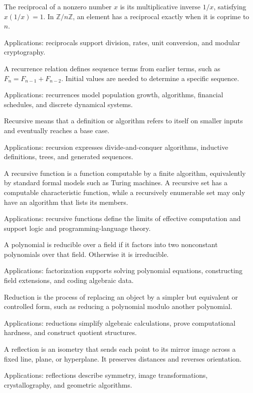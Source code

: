 The reciprocal of a nonzero number $x$ is its multiplicative inverse $1/x$, satisfying $x(1/x)=1$. In $\mathbb Z/n\mathbb Z$, an element has a reciprocal exactly when it is coprime to $n$. \par\noindent Applications: reciprocals support division, rates, unit conversion, and modular cryptography.

A recurrence relation defines sequence terms from earlier terms, such as $F_n=F_{n-1}+F_{n-2}$. Initial values are needed to determine a specific sequence. \par\noindent Applications: recurrences model population growth, algorithms, financial schedules, and discrete dynamical systems.

Recursive means that a definition or algorithm refers to itself on smaller inputs and eventually reaches a base case. \par\noindent Applications: recursion expresses divide-and-conquer algorithms, inductive definitions, trees, and generated sequences.

A recursive function is a function computable by a finite algorithm, equivalently by standard formal models such as Turing machines. A recursive set has a computable characteristic function, while a recursively enumerable set may only have an algorithm that lists its members. \par\noindent Applications: recursive functions define the limits of effective computation and support logic and programming-language theory.

A polynomial is reducible over a field if it factors into two nonconstant polynomials over that field. Otherwise it is irreducible. \par\noindent Applications: factorization supports solving polynomial equations, constructing field extensions, and coding algebraic data.

Reduction is the process of replacing an object by a simpler but equivalent or controlled form, such as reducing a polynomial modulo another polynomial. \par\noindent Applications: reductions simplify algebraic calculations, prove computational hardness, and construct quotient structures.

A reflection is an isometry that sends each point to its mirror image across a fixed line, plane, or hyperplane. It preserves distances and reverses orientation. \par\noindent Applications: reflections describe symmetry, image transformations, crystallography, and geometric algorithms.

